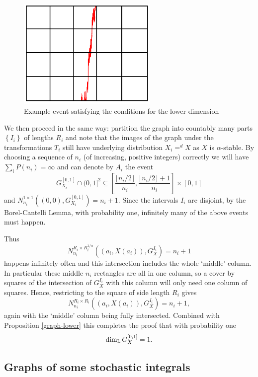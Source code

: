 \begin{figure}[h]
    \centering
    \includegraphics[width=0.6\textwidth]{pics/ch-brownian/rectangles-graph2.png}
    \caption{Example event satisfying the conditions for the lower dimension}
    \label{fig:rectangles-graph2}
\end{figure}


We then proceed in the same way: partition the graph into countably many parts $\left\{I_i \right\}$ of lengths $R_i$ and note that the images of the graph under the transformations $T_i$ still have underlying distribution $X_i =^d X$ as $X$ is $\alpha$-stable. By choosing a sequence of $n_i$ (of increasing, positive integers) correctly we will have $\sum_{i}P(n_i) = \infty$ and can denote by $A_i$ the event 
$$G_{X_i}^{[0,1]} \cap (0,1]^2 \subseteq \left[\frac{\lfloor n_i/2 \rfloor}{n_i} ,  \frac{\lfloor n_i/2 \rfloor + 1}{n_i} \right] \times [0,1]$$
and $N_{n_i}^{1\times 1}((0,0),G_{X_i}^{[0,1]}) = n_i + 1$. Since the intervals $I_i$ are disjoint, by the Borel-Cantelli Lemma, with probability one, infinitely many of the above events must happen.

Thus 
\[
N_{n_i}^{R_i \times R_i^{1/\alpha}}\left((a_i,X(a_i)), G_X^{I_i}\right) = n_i + 1
\]
happens infinitely often and this intersection includes the whole `middle' column. In particular these middle $n_i$ rectangles are all in one column, so a cover by squares of the intersection of $G_X^{I_i}$ with this column will only need one column of squares. Hence, restricting to the square of side length $R_i$ gives
\[
N_{n_i}^{R_i \times R_i}\left((a_i,X(a_i)), G_X^{I_i}\right) = n_i + 1,
\]
again with the `middle' column being fully intersected. Combined with Proposition \ref{graph-lower} this completes the proof that with probability one 
\[
\dim_{\textup{L}} G_X^{[0,1]} = 1.
\]



\subsection{Graphs of some stochastic integrals}

